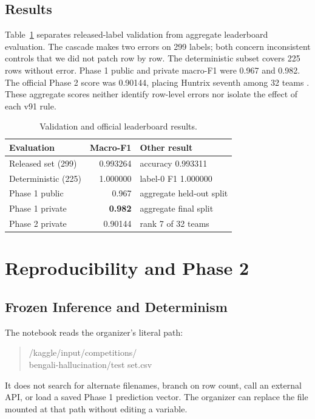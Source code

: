 \documentclass[11pt]{article}
\begin{document}
\subsection{Results}

Table~\ref{tab:results} separates released-label validation from aggregate leaderboard evaluation. The cascade makes two errors on 299 labels; both concern inconsistent controls that we did not patch row by row. The deterministic subset covers 225 rows without error. Phase 1 public and private macro-F1 were 0.967 and 0.982. The official Phase 2 score was 0.90144, placing Huntrix seventh among 32 teams \citep{phase2results}. These aggregate scores neither identify row-level errors nor isolate the effect of each v91 rule.

\begin{table}[t]
\caption{Validation and official leaderboard results.}
\label{tab:results}
\centering
\small
\begin{tabular}{@{}lrl@{}}
\toprule
Evaluation & Macro-F1 & Other result \\
\midrule
Released set (299) & 0.993264 & accuracy 0.993311 \\
Deterministic (225) & 1.000000 & label-0 F1 1.000000 \\
Phase 1 public & 0.967 & aggregate held-out split \\
Phase 1 private & \textbf{0.982} & aggregate final split \\
Phase 2 private & 0.90144 & rank 7 of 32 teams \\
\bottomrule
\end{tabular}
\end{table}

\section{Reproducibility and Phase 2}

\subsection{Frozen Inference and Determinism}

The notebook reads the organizer's literal path:

\begin{quote}
\small\ttfamily
/kaggle/input/competitions/\\
bengali-hallucination/test set.csv
\end{quote}

It does not search for alternate filenames, branch on row count, call an external API, or load a saved Phase 1 prediction vector. The organizer can replace the file mounted at that path without editing a variable.
\end{document}
